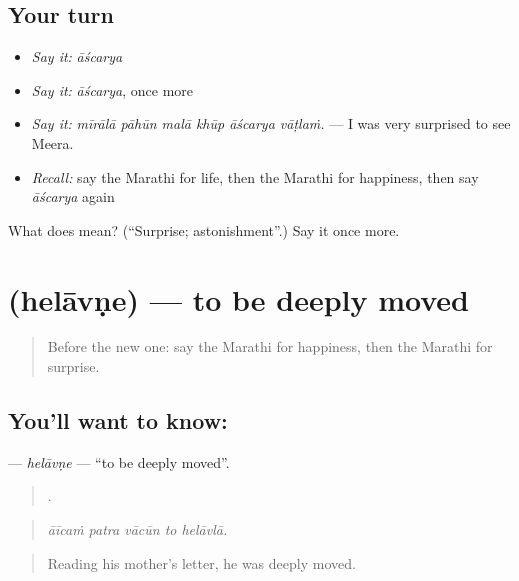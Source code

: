 \subsection*{Your turn}
\begin{itemize}
\raggedright
  \item \emph{Say it:} \emph{āścarya}
  \item \emph{Say it:} \emph{āścarya}, once more
  \item \emph{Say it:} \emph{mīrālā pāhūn malā khūp āścarya vāṭlaṁ.} — I was very surprised to see Meera.
  \item \emph{Recall:} say the Marathi for life, then the Marathi for happiness, then say \emph{āścarya} again
\end{itemize}

\begin{tcolorbox}[breakable,colback=teal!4,colframe=teal!35!black,title={Before you move on}]
What does  mean? (\textquotedblleft{}Surprise; astonishment\textquotedblright{}.) Say it once more.
\end{tcolorbox}
\section[\texorpdfstring{\mr{हेलावणे} (helāvṇe)}{हेलावणे (helāvṇe)}]{ (helāvṇe) — to be deeply moved}

\label{lesson:MR-C450-helavne}



\begin{quote}
Before the new one: say the Marathi for happiness, then the Marathi for surprise.
\end{quote}

\subsection*{You'll want to know: }
\textbf{} — \emph{helāvṇe} — \textquotedblleft{}to be deeply moved\textquotedblright{}.

\begin{quote}
    .
\end{quote}

\begin{quote}
\emph{āīcaṁ patra vācūn to helāvlā.}
\end{quote}

\begin{quote}
Reading his mother's letter, he was deeply moved.
\end{quote}

